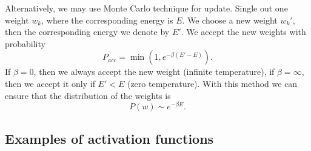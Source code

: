 \documentclass[10pt,a4paper]{article}
\begin{document}
Alternatively, we may use Monte Carlo technique for update. Single out one weight $w_k$, where the corresponding energy is $E$. We choose a new weight $w_k'$, then the corresponding energy we denote by $E'$. We accept the new weights with probability
\begin{equation}
  P_{acc} = \min\left(1, e^{-\beta(E'-E)}\right).
\end{equation}
If $\beta=0$, then we always accept the new weight (infinite temperature), if $\beta=\infty$, then we accept it only if $E'<E$ (zero temperature). With this method we can ensure that the distribution of the weights is
\begin{equation}
  P(w) \sim e^{-\beta E}.
\end{equation}


\subsection{Examples of activation functions}
\end{document}
